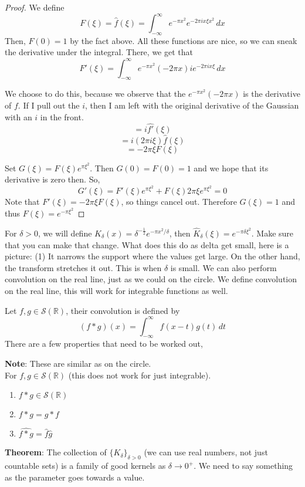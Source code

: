 \documentclass[12pt]{article}
\begin{document}
\begin{proof}
We define $$F(\xi) = \hat{f}(\xi) = \int^\infty_{-\infty} e^{-\pi x^2} e^{-2\pi i x \xi x^2} \, dx$$
Then, $F(0)=1$ by the fact above. All these functions are nice, so we can sneak the derivative under the integral. There, we get that
$$F'(\xi) = \int^\infty_{-\infty} e^{-\pi x^2}(-2\pi x) i e^{-2\pi ix \xi } \, dx$$

We choose to do this, because we observe that the $e^{-\pi x^2}(-2\pi x)$ is the derivative of $f$. If I pull out the $i$, then I am left with the original derivative of the Gaussian with an $i$ in the front.
$$= i \hat{f'}(\xi)$$
$$=i(2\pi i \xi) \hat{f}(\xi)$$
$$= -2\pi \xi F(\xi)$$

Set $G(\xi) = F(\xi)e^{\pi\xi^2}$. Then $G(0)=F(0)=1$ and we hope that its derivative is zero then. So,
$$G'(\xi) = F'(\xi) e^{\pi \xi^2} + F(\xi) 2\pi \xi e^{\pi \xi^2} = 0$$
Note that $F'(\xi) = -2\pi \xi F(\xi)$, so things cancel out. Therefore $G(\xi)=1$ and thus $F(\xi) = e^{-\pi\xi^2}$
\end{proof}
For $\delta> 0$, we will define 
$K_\delta (x) = \delta^{-\frac{1}{2}} e^{-\pi x^2 / \delta}$, then $\hat{K}_\delta (\xi) = e^{-\pi\delta\xi^2}$. Make sure that you can make that change. What does this do as delta get small, here is a picture: (1) It narrows the support where the values get large. On the other hand, the transform stretches it out. This is when $\delta$ is small. We can also perform convolution on the real line, just as we could on the circle. We define convolution on the real line, this will work for integrable functions as well.

Let $f,g \in \mathcal{S}(\mathbb{R})$, their convolution is defined by 
$$(f*g)(x) = \int^{\infty}_{-\infty} f(x-t) g(t) \,dt$$
There are a few properties that need to be worked out,

\textbf{Note}: These are similar as on the circle. \\
\noindent For $f,g \in \mathcal{S}(\mathbb{R})$ (this does not work for just integrable). \\
\begin{enumerate}
\item $f*g \in \mathcal{S}(\mathbb{R})$
\item $f*g = g*f$
\item $\widehat{f*g} = \hat{f}\hat{g}$
\end{enumerate}

\textbf{Theorem}: The collection of $\{K_\delta\}_{\delta>0}$ (we can use real numbers, not just countable sets) is a family of good kernels as $\delta \rightarrow 0^+$. We need to say something as the parameter goes towards a value. 
\end{document}
